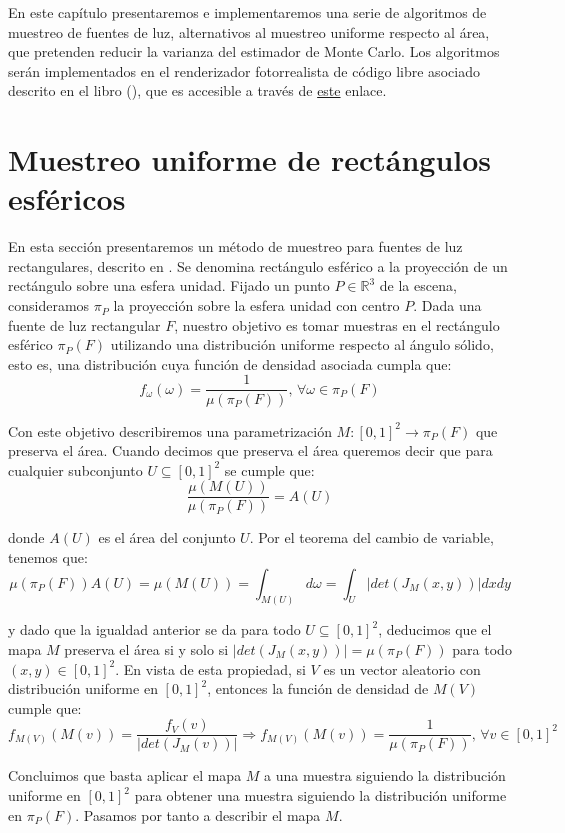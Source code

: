 En este capítulo presentaremos e implementaremos una serie de algoritmos de muestreo de fuentes de luz, alternativos al muestreo uniforme respecto al área, que pretenden reducir la varianza del estimador de Monte Carlo. Los algoritmos serán implementados en el renderizador fotorrealista de código libre asociado descrito en el libro (), que es accesible a través de \href{https://github.com/mmp/pbrt-v3}{este} enlace. 

\section{Muestreo uniforme de rectángulos esféricos}

En esta sección presentaremos un método de muestreo para fuentes de luz rectangulares, descrito en \cite{Urena2013}. Se denomina rectángulo esférico a la proyección de un rectángulo sobre una esfera unidad. Fijado un punto $P\in\mathds{R}^3$ de la escena, consideramos $\pi_P$ la proyección sobre la esfera unidad con centro $P$. Dada una fuente de luz rectangular $F$, nuestro objetivo es tomar muestras en el rectángulo esférico $\pi_P(F)$ utilizando una distribución uniforme respecto al ángulo sólido, esto es, una distribución cuya función de densidad asociada cumpla que:
$$f_{\omega}(\omega) = \frac{1}{\mu(\pi_P(F))}\text{, }\forall \omega\in\pi_P(F)$$

Con este objetivo describiremos una parametrización $M:[0,1]^2\rightarrow \pi_P(F)$ que preserva el área. Cuando decimos que preserva el área queremos decir que para cualquier subconjunto $U\subseteq [0,1]^2$ se cumple que:
$$\frac{\mu(M(U))}{\mu(\pi_P(F))} = A(U)$$

donde $A(U)$ es el área del conjunto $U$. Por el teorema del cambio de variable, tenemos que:
$$\mu(\pi_P(F))A(U) = \mu(M(U)) = \int_{M(U)}d\omega = \int_{U}|det(J_M(x,y))| dxdy $$

y dado que la igualdad anterior se da para todo $U\subseteq [0,1]^2$, deducimos que el mapa $M$ preserva el área si y solo si $|det(J_M(x,y))| = \mu(\pi_P(F))$ para todo $(x,y)\in[0,1]^2$. En vista de esta propiedad, si $V$ es un vector aleatorio con distribución uniforme en $[0,1]^2$, entonces la función de densidad de $M(V)$ cumple que:
$$f_{M(V)}(M(v)) = \frac{f_V(v)}{|det(J_M(v))|}\Rightarrow f_{M(V)}(M(v)) =\frac{1}{\mu(\pi_P(F))} \text{, }\forall v\in [0,1]^2$$

Concluimos que basta aplicar el mapa $M$ a una muestra siguiendo la distribución uniforme en $[0,1]^2$ para obtener una muestra siguiendo la distribución uniforme en $\pi_P(F)$. Pasamos por tanto a describir el mapa $M$.\\

